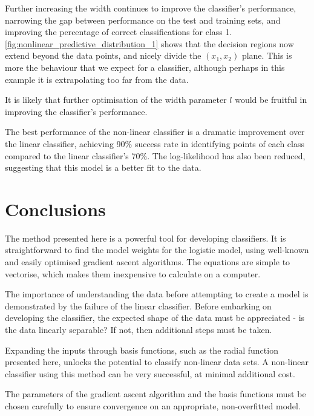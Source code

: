 \documentclass[a4paper]{article}
\begin{document}
    Further increasing the width continues to improve the classifier's performance, narrowing the gap between
    performance on the test and training sets, and improving the percentage of correct classifications for class 1.
    \autoref{fig:nonlinear_predictive_distribution_1} shows that the decision regions now extend beyond the data points,
    and nicely divide the $(x_1, x_2)$ plane. This is more the behaviour that we expect for a classifier,
    although perhaps in this example it is extrapolating too far from the data.

    It is likely that further optimisation of the width parameter $l$ would be fruitful in improving the
    classifier's performance.

    The best performance of the non-linear classifier is a dramatic improvement over the linear classifier, achieving 90\%
    success rate in identifying points of each class compared to the linear classifier's 70\%. The log-likelihood has also
    been reduced, suggesting that this model is a better fit to the data.

    \section{Conclusions}
    The method presented here is a powerful tool for developing classifiers. It is straightforward to find the
    model weights for the logistic model, using well-known and easily optimised gradient ascent algorithms. The equations
    are simple to vectorise, which makes them inexpensive to calculate on a computer.

    The importance of understanding the data before attempting to create a model is demonstrated by the failure
    of the linear classifier. Before embarking on developing the classifier, the expected shape of the data must be
    appreciated - is the data linearly separable? If not, then additional steps must be taken.

    Expanding the inputs through basis functions, such as the radial function presented here, unlocks the potential
    to classify non-linear data sets. A non-linear classifier using this method can be very successful, at minimal
    additional cost.

    The parameters of the gradient ascent algorithm and the basis functions must be chosen carefully
    to ensure convergence on an appropriate, non-overfitted model.
\end{document}
